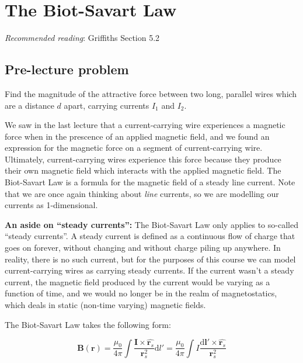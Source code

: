 \documentclass[
  letterpaper,
  DIV=11,
  numbers=noendperiod]{scrreprt}
\begin{document}
\chapter{The Biot-Savart Law}\label{the-biot-savart-law}

\newcommand{\l}{\mathrm{\mathbf{l}}}
\newcommand{\E}{\mathrm{\mathbf{E}}}
\newcommand{\F}{\mathrm{\mathbf{F}}}
\newcommand{\r}{\mathrm{\mathbf{r}}}

\newcommand{\x}{\mathrm{\mathbf{x}}}
\newcommand{\y}{\mathrm{\mathbf{y}}}
\newcommand{\z}{\mathrm{\mathbf{z}}}

\emph{Recommended reading}: Griffiths Section 5.2

\section{Pre-lecture problem}\label{pre-lecture-problem-3}

Find the magnitude of the attractive force between two long, parallel
wires which are a distance \(d\) apart, carrying currents \(I_1\) and
\(I_2\).

We saw in the last lecture that a current-carrying wire experiences a
magnetic force when in the prescence of an applied magnetic field, and
we found an expression for the magnetic force on a segment of
current-carrying wire. Ultimately, current-carrying wires experience
this force because they produce their own magnetic field which interacts
with the applied magnetic field. The Biot-Savart Law is a formula for
the magnetic field of a steady line current. Note that we are once again
thinking about \emph{line} currents, so we are modelling our currents as
1-dimensional.

\textbf{An aside on ``steady currents'':} The Biot-Savart Law only
applies to so-called ``steady currents''. A steady current is defined as
a continuous flow of charge that goes on forever, without changing and
without charge piling up anywhere. In reality, there is no such current,
but for the purposes of this course we can model current-carrying wires
as carrying steady currents. If the current wasn't a steady current, the
magnetic field produced by the current would be varying as a function of
time, and we would no longer be in the realm of magnetostatics, which
deals in static (non-time varying) magnetic fields.

The Biot-Savart Law takes the following form:

\[\mathrm{\mathbf{B}}(\mathrm{\mathbf{r}}) = \frac{\mu_0}{4\pi} \int \frac{\mathrm{\mathbf{I}}\times \hat{\mathrm{\mathbf{r}}_s} }{\mathrm{\mathbf{r}}_s^2} \mathrm{d}l' =  \frac{\mu_0}{4\pi} \int I \frac{\mathrm{d} \mathrm{\mathbf{l}}' \times \hat{\mathrm{\mathbf{r}}_s} }{\mathrm{\mathbf{r}}_s^2} \]
\end{document}
